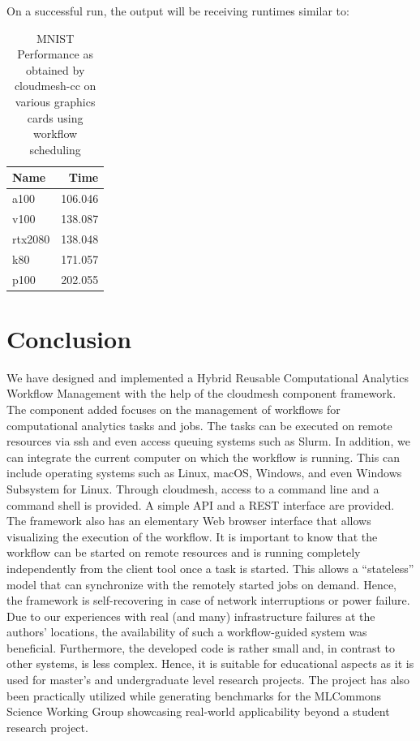 \documentclass[sigplan,screen]{acmart}
\newcommand{\FILE}[1]{}
\begin{document}
On a successful run, the output will be receiving runtimes similar to:

\begin{table}[!ht]
\caption{MNIST Performance as obtained by cloudmesh-cc on various graphics cards using workflow scheduling}
    \centering
    \begin{tabular}{lr}
    \hline
        Name & Time \\ \hline
        a100 & 106.046 \\ 
        v100 & 138.087 \\ 
        rtx2080 & 138.048 \\
        k80 & 171.057 \\ 
        p100 & 202.055 \\
    \end{tabular}
    \label{table:mnist-times}
  \end{table}
  


% 

\FILE{conclusion.tex}

\section{Conclusion}

We have designed and implemented a Hybrid Reusable Computational
Analytics Workflow Management with the help of the cloudmesh component
framework. The component added focuses on the management of workflows
for computational analytics tasks and jobs. The tasks can be executed
on remote resources via ssh and even access queuing systems such as
Slurm. In addition, we can integrate the current computer on which the
workflow is running. This can include operating systems such as Linux,
macOS, Windows, and even Windows Subsystem for Linux. Through
cloudmesh, access to a command line and a command shell is provided. A
simple API and a REST interface are provided. The framework also has
an elementary Web browser interface that allows visualizing the
execution of the workflow. It is important to know that the workflow
can be started on remote resources and is running completely
independently from the client tool once a task is started. This allows
a ``stateless'' model that can synchronize with the remotely started
jobs on demand. Hence, the framework is self-recovering in case of
network interruptions or power failure. Due to our experiences with
real (and many) infrastructure failures at the authors' locations, the
availability of such a workflow-guided system was
beneficial. Furthermore, the developed code is rather small and, in
contrast to other systems, is less complex. Hence, it is suitable for
educational aspects as it is used for master's and undergraduate level
research projects. The project has also been practically utilized
while generating benchmarks for the MLCommons Science Working Group
showcasing real-world applicability beyond a student research project.
\end{document}
